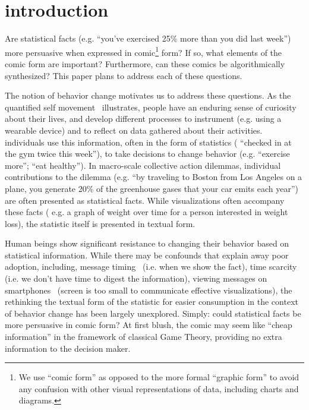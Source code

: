 



\section{introduction}
\label{sec:introduction}

Are statistical facts (e.g. ``you've exercised 25\% more than you did last week'') more persuasive when expressed in comic\footnote{We use ``comic form'' as opposed to the more formal ``graphic form'' to avoid any confusion with other visual representations of data, including charts and diagrams.} form? If so, what elements of the comic form are important? Furthermore, can these comics be algorithmically synthesized? This paper plans to address each of these questions.

The notion of behavior change motivates us to address these questions. As the quantified self movement~\cite{Epstein2014,Choe2014} illustrates, people have an enduring sense of curiosity about their lives, and develop different processes to instrument (e.g. using a wearable device) and to reflect on data gathered about their activities. individuals use this information, often in the form of statistics ( ``checked in at the gym twice this week''), to take decisions to change behavior (e.g. ``exercise more''; ``eat healthy''). In macro-scale collective action dilemmas, individual contributions to the dilemma (e.g. ``by traveling to Boston from Los Angeles on a plane, you generate 20\% of the greenhouse gases that your car emits each year'') are often presented as statistical facts. While visualizations often accompany these facts ( e.g. a graph of weight over time for a person interested in weight loss), the statistic itself is presented in textual form.

Human beings show significant resistance to changing their behavior based on statistical information. While there may be confounds that explain away poor adoption, including, message timing~\cite{Fogg2009} (i.e. when we show the fact), time scarcity~\cite{Janssen2016} (i.e. we don't have time to digest the information), viewing messages on smartphones~\cite{Kim2016} (screen is too small to communicate effective visualizations), the rethinking the textual form of the statistic for easier consumption in the context of behavior change has been largely unexplored. Simply: could statistical facts be more persuasive in comic form? At first blush, the comic may seem like ``cheap information'' in the framework of classical Game Theory, providing no extra information to the decision maker.

